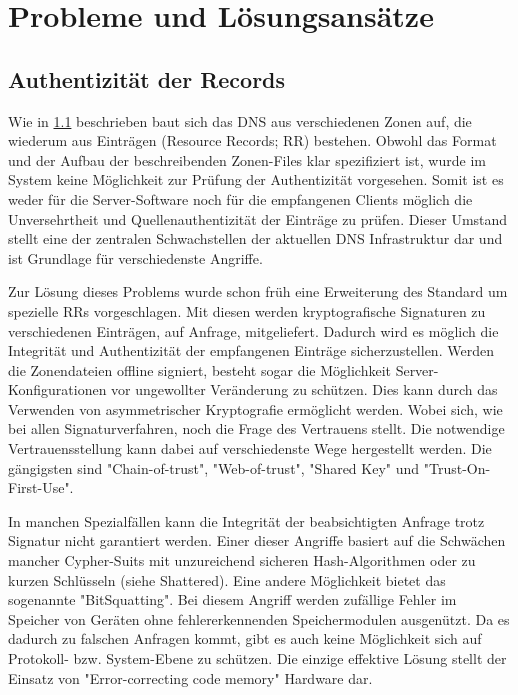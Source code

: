 \chapter{Probleme und Lösungsansätze}

\section{Authentizität der Records}
Wie in \ref{} beschrieben baut sich das DNS aus verschiedenen Zonen auf, die wiederum aus Einträgen (Resource Records; RR) bestehen. Obwohl das Format und der Aufbau der beschreibenden Zonen-Files klar spezifiziert ist, wurde im System keine Möglichkeit zur Prüfung der Authentizität vorgesehen. Somit ist es weder für die Server-Software noch für die empfangenen Clients möglich die Unversehrtheit und Quellenauthentizität der Einträge zu prüfen. Dieser Umstand stellt eine der zentralen Schwachstellen der aktuellen DNS Infrastruktur dar und ist Grundlage für verschiedenste Angriffe.

Zur Lösung dieses Problems wurde schon früh eine Erweiterung des Standard um spezielle RRs vorgeschlagen. Mit diesen werden kryptografische Signaturen zu verschiedenen Einträgen, auf Anfrage, mitgeliefert. Dadurch wird es möglich die Integrität und Authentizität der empfangenen Einträge sicherzustellen. Werden die Zonendateien offline signiert, besteht sogar die Möglichkeit Server-Konfigurationen vor ungewollter Veränderung zu schützen. Dies kann durch das Verwenden von asymmetrischer Kryptografie ermöglicht werden. Wobei sich, wie bei allen Signaturverfahren, noch die Frage des Vertrauens stellt. Die notwendige Vertrauensstellung kann dabei auf verschiedenste Wege hergestellt werden. Die gängigsten sind "Chain-of-trust", "Web-of-trust", "Shared Key" und "Trust-On-First-Use".

In manchen Spezialfällen kann die Integrität der beabsichtigten Anfrage trotz Signatur nicht garantiert werden. Einer dieser Angriffe basiert auf die Schwächen mancher Cypher-Suits mit unzureichend sicheren Hash-Algorithmen oder zu kurzen Schlüsseln (siehe Shattered). Eine andere Möglichkeit bietet das sogenannte "BitSquatting". Bei diesem Angriff werden zufällige Fehler im Speicher von Geräten ohne fehlererkennenden Speichermodulen ausgenützt. Da es dadurch zu falschen Anfragen kommt, gibt es auch keine Möglichkeit sich auf Protokoll- bzw. System-Ebene zu schützen. Die einzige effektive Lösung stellt der Einsatz von "Error-correcting code memory" Hardware dar.   

